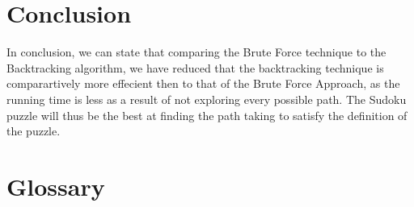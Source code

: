 \documentclass[12pt]{article}
\begin{document}
\section{Conclusion}
\begin{flushleft}
In conclusion, we can state that comparing the Brute Force technique to the Backtracking algorithm, we have reduced that the backtracking technique is comparartively more effecient then to that of the Brute Force Approach, as the running time is less as a result of not exploring every possible path. The Sudoku puzzle will thus be the best at finding the path taking to satisfy the definition of the puzzle. 
\end{flushleft}
\section{Glossary}
\end{document}
